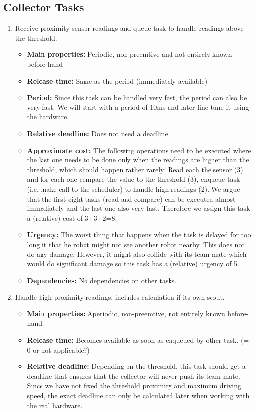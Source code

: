 \documentclass[12pt]{article}
\begin{document}
\subsection*{Collector Tasks}
\begin{enumerate}
  \item Receive proximity sensor readings and queue task to handle readings above the threshold.
  	\begin{itemize}
  	\item \textbf{Main properties:} Periodic, non-preemtive and not entirely known before-hand
  	\item \textbf{Release time:} Same as the period (immediately available)
  	\item \textbf{Period:} Since this task can be handled very fast, the period can also be very fast. We will start with a period of 10ms and later fine-tune it using the hardware.
  	\item \textbf{Relative deadline:} Does not need a deadline
  	\item \textbf{Approximate cost:} The following operations need to be executed where the last one needs to be done only when the readings are higher than the threshold, which should happen rather rarely: Read each the sensor (3) and for each one compare the value to the threshold (3), enqueue task (i.e. make call to the scheduler) to handle high readings (2). We argue that the first eight tasks (read and compare) can be executed almost immediately and the last one also very fast. Therefore we assign this task a (relative) cost of 3+3+2=8.
  	\item \textbf{Urgency:} The worst thing that happens when the task is delayed for too long it that he robot might not see another robot nearby. This does not do any damage. However, it might also collide with its team mate which would do significant damage so this task has a (relative) urgency of 5.
  	\item \textbf{Dependencies:} No dependencies on other tasks.
  	\end{itemize}
  \item Handle high proximity readings, includes calculation if its own scout.
  	\begin{itemize}
  	\item \textbf{Main properties:} Aperiodic, non-preemtive, not entirely known before-hand
  	\item \textbf{Release time:} Becomes available as soon as enqueued by other task. (= 0 or not applicable?)
  	\item \textbf{Relative deadline:} Depending on the threshold, this task should get a deadline that ensures that the collector will never push its team mate. Since we have not fixed the threshold proximity and maximum driving speed, the exact deadline can only be calculated later when working with the real hardware.

\end{itemize}
\end{enumerate}
\end{document}
